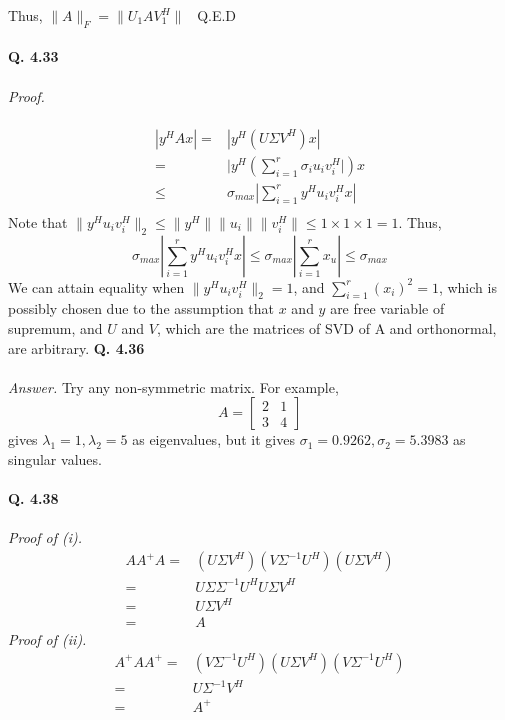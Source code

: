 \documentclass[letterpaper,12pt]{article}
\theoremstyle{definition}
\begin{document}
Thus, $\|A\|_F = \|U_1 A V_{1}^H\|$ \ Q.E.D \\\\
\textbf{Q. 4.33}\\\\
\emph{Proof.} \\\\
\begin{align*}
 |y^H A x|  =& |y^H (U \Sigma V^H) x| \\
            =& |y^H (\sum_{i=1}^{r} \sigma_i u_i v_{i}^H |)x \\
         \leq& \sigma_{max} | \sum_{i=1}^{r} y^H u_i v_{i}^H x |\\
\end{align*}
Note that $\| y^H u_i v_{i}^H \|_2 \leq \| y^H \| \|u_i\| \|v_{i}^H\| \leq 1 \times 1 \times 1 = 1 $. Thus,
\[\sigma_{max} | \sum_{i=1}^{r} y^H u_i v_{i}^H x | \leq \sigma_{max} | \sum_{i=1}^{r} x_u | \leq \sigma_{max} \]
We can attain equality when $\| y^H u_i v_{i}^H \|_2 = 1$, and $\sum_{i=1}^{r} (x_i)^2 = 1$, which is possibly chosen due to the assumption that $x$ and $y$ are free variable of supremum, and $U$ and $V$, which are the matrices of SVD of A and orthonormal, are arbitrary.
\textbf{Q. 4.36}\\\\
\emph{Answer.} Try any non-symmetric matrix. For example,
\[A =
\begin{bmatrix}
  2 & 1 \\
  3 & 4
\end{bmatrix}
\]
gives $\lambda_1 = 1, \lambda_2 = 5$ as eigenvalues, but it gives $\sigma_1 = 0.9262, \sigma_2 = 5.3983$ as singular values. \\\\
\textbf{Q. 4.38}\\\\
\emph{Proof of (i).}
\begin{align*}
  A A^{+} A =& (U \Sigma V^H) (V \Sigma^{-1} U^H) (U \Sigma V^H) \\
            =& U \Sigma \Sigma^{-1} U^H U \Sigma V^H \\
            =& U \Sigma V^H \\
            =& A
\end{align*}
\emph{Proof of (ii).}
\begin{align*}
  A^{+} A A^{+} =& (V \Sigma^{-1} U^H) (U \Sigma V^H) (V \Sigma^{-1} U^H) \\
                =& U \Sigma^{-1} V^H \\
                =& A^{+}
\end{align*}
\end{document}
